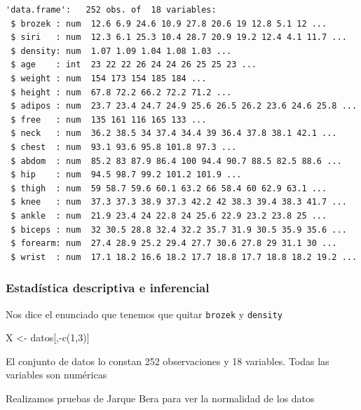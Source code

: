 \documentclass[
  letterpaper,
  DIV=11,
  numbers=noendperiod]{scrartcl}
\newenvironment{Shaded}{\begin{snugshade}}{\end{snugshade}}
\newcommand{\ControlFlowTok}[1]{\textcolor[rgb]{0.00,0.23,0.31}{#1}}
\newcommand{\DecValTok}[1]{\textcolor[rgb]{0.68,0.00,0.00}{#1}}
\newcommand{\FloatTok}[1]{\textcolor[rgb]{0.68,0.00,0.00}{#1}}
\newcommand{\FunctionTok}[1]{\textcolor[rgb]{0.28,0.35,0.67}{#1}}
\newcommand{\NormalTok}[1]{\textcolor[rgb]{0.00,0.23,0.31}{#1}}
\newcommand{\OtherTok}[1]{\textcolor[rgb]{0.00,0.23,0.31}{#1}}
\newcommand{\SpecialCharTok}[1]{\textcolor[rgb]{0.37,0.37,0.37}{#1}}
\begin{document}
\begin{verbatim}
'data.frame':   252 obs. of  18 variables:
 $ brozek : num  12.6 6.9 24.6 10.9 27.8 20.6 19 12.8 5.1 12 ...
 $ siri   : num  12.3 6.1 25.3 10.4 28.7 20.9 19.2 12.4 4.1 11.7 ...
 $ density: num  1.07 1.09 1.04 1.08 1.03 ...
 $ age    : int  23 22 22 26 24 24 26 25 25 23 ...
 $ weight : num  154 173 154 185 184 ...
 $ height : num  67.8 72.2 66.2 72.2 71.2 ...
 $ adipos : num  23.7 23.4 24.7 24.9 25.6 26.5 26.2 23.6 24.6 25.8 ...
 $ free   : num  135 161 116 165 133 ...
 $ neck   : num  36.2 38.5 34 37.4 34.4 39 36.4 37.8 38.1 42.1 ...
 $ chest  : num  93.1 93.6 95.8 101.8 97.3 ...
 $ abdom  : num  85.2 83 87.9 86.4 100 94.4 90.7 88.5 82.5 88.6 ...
 $ hip    : num  94.5 98.7 99.2 101.2 101.9 ...
 $ thigh  : num  59 58.7 59.6 60.1 63.2 66 58.4 60 62.9 63.1 ...
 $ knee   : num  37.3 37.3 38.9 37.3 42.2 42 38.3 39.4 38.3 41.7 ...
 $ ankle  : num  21.9 23.4 24 22.8 24 25.6 22.9 23.2 23.8 25 ...
 $ biceps : num  32 30.5 28.8 32.4 32.2 35.7 31.9 30.5 35.9 35.6 ...
 $ forearm: num  27.4 28.9 25.2 29.4 27.7 30.6 27.8 29 31.1 30 ...
 $ wrist  : num  17.1 18.2 16.6 18.2 17.7 18.8 17.7 18.8 18.2 19.2 ...
\end{verbatim}

\hypertarget{estaduxedstica-descriptiva-e-inferencial}{%
\subsubsection{Estadística descriptiva e
inferencial}\label{estaduxedstica-descriptiva-e-inferencial}}

Nos dice el enunciado que tenemos que quitar \texttt{brozek} y
\texttt{density}

\begin{Shaded}
\begin{Highlighting}[]
\NormalTok{X }\OtherTok{\textless{}{-}}\NormalTok{ datos[,}\SpecialCharTok{{-}}\FunctionTok{c}\NormalTok{(}\DecValTok{1}\NormalTok{,}\DecValTok{3}\NormalTok{)]}
\end{Highlighting}
\end{Shaded}

El conjunto de datos lo constan 252 observaciones y 18 variables. Todas
las variables son numéricas

Realizamos pruebas de Jarque Bera para ver la normalidad de los datos

\begin{Shaded}
\end{Shaded}
\end{document}
